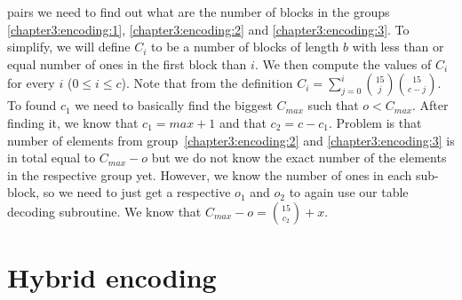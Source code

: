 pairs we need to find out what are the number of blocks in the groups \ref{chapter3:encoding:1},
\ref{chapter3:encoding:2} and \ref{chapter3:encoding:3}. To simplify, we will define $C_i$ to be a 
number of blocks of length $b$ with less than or equal number of ones in the first block than $i$.
We then compute the values of $C_i$ for every $i$ ($0\leq i\leq c$). Note that from the definition
$C_i = \sum_{j=0}^{i} {15 \choose j} {15 \choose c-j}$. To found $c_1$ we need to basically find the
biggest $C_{max}$ such that $o<C_{max}$. After finding it, we know that $c_1 = max+1$ and that
$c_2 = c - c_1$. Problem is that number of elements from group~\ref{chapter3:encoding:2} and
\ref{chapter3:encoding:3} is in total equal to $C_{max}-o$ but we do not know the exact number
of the elements in the respective group yet. However, we know the number of ones in each sub-block,
so we need to just get a respective $o_1$ and $o_2$ to again use our table decoding subroutine. We
know that $C_{max}-o = {15 \choose c_2} + x$.

\section{Hybrid encoding}